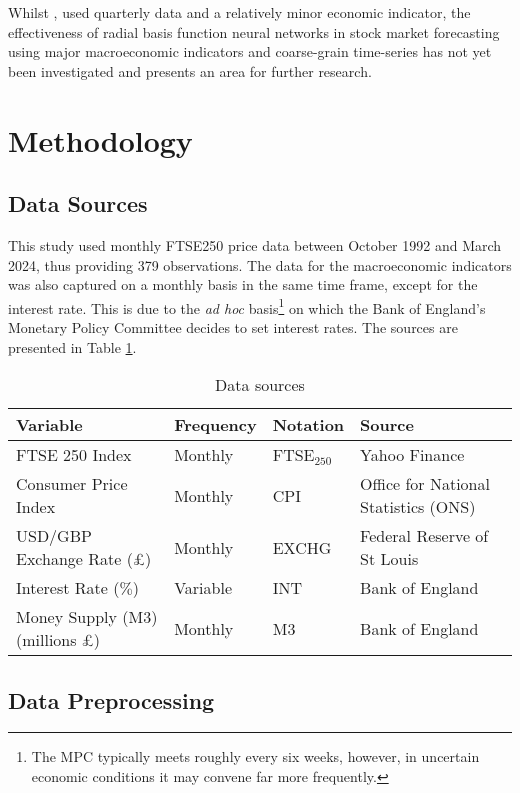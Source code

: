 \documentclass[11pt,a4paper]{article}
\newcommand{\citeboth}[1]{\citeauthor{#1} \citep{#1}}
\begin{document}
Whilst \citeboth{abotaleb2024}, used quarterly data and a relatively minor economic indicator, the effectiveness of radial basis function neural networks in stock market forecasting using 
major macroeconomic indicators and coarse-grain time-series has not yet been investigated and presents an area for further 
research. 

\section{Methodology}
\label{sec:meth}

\subsection{Data Sources}

This study used monthly FTSE250 price data between October 1992 and March 2024,
thus providing 379 observations. The data for the macroeconomic indicators 
was also captured on a monthly basis in the same time frame, except for the 
interest rate. This is due to the
\textit{ad hoc} 
basis\footnote{The MPC typically meets roughly every six weeks, however, in uncertain economic 
conditions it may convene far more frequently.} on which the
Bank of England's Monetary Policy 
Committee decides to set interest rates. The sources 
are presented in Table \ref{table: tabl}.

\begin{table}[h!]
    \centering
    \caption{Data sources}
    \label{table: tabl}
    \begin{tabular}{llll}
        \toprule
        \textbf{Variable} & \textbf{Frequency} & \textbf{Notation} & \textbf{Source} \\
        \midrule
        FTSE 250 Index & Monthly & FTSE$_{250}$ & Yahoo Finance \\
        Consumer Price Index & Monthly & CPI & Office for National Statistics (ONS) \\
        USD/GBP Exchange Rate (£) & Monthly & EXCHG & Federal Reserve of St Louis \\
        Interest Rate ($\%$) & Variable & INT & Bank of England \\
        Money Supply (M3) (millions £) & Monthly & M3 & Bank of England \\
        \bottomrule
    \end{tabular}
\end{table}



\subsection{Data Preprocessing}
\label{section: prep}
\end{document}
